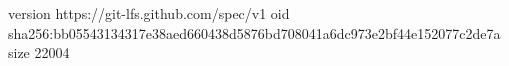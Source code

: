 version https://git-lfs.github.com/spec/v1
oid sha256:bb05543134317e38aed660438d5876bd708041a6dc973e2bf44e152077c2de7a
size 22004
